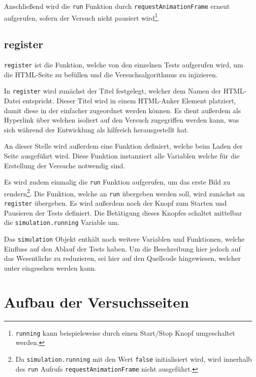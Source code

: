 Anschließend wird die \lstinline{run} Funktion durch \lstinline{requestAnimationFrame} erneut aufgerufen, sofern der Versuch nicht pausiert wird\footnote{\lstinline{running} kann beispielsweise durch einen Start/Stop Knopf umgeschaltet werden.}.

\subsection{register}\label{ch:sim_register}

\lstinline{register} ist die Funktion, welche von den einzelnen Tests aufgerufen wird, um die HTML-Seite zu befüllen und die Versuchsalgorithmus zu injizieren.

In \lstinline{register} wird zunächst der Titel festgelegt, welcher dem Namen der HTML-Datei entspricht.
Dieser Titel wird in einem HTML-Anker Element platziert, damit diese in der  einfacher zugeordnet werden können.
Es dient au{\ss}erdem als Hyperlink über welchen isoliert auf den Versuch zugegriffen werden kann, was sich während der Entwicklung als hilfreich herausgestellt hat.

An dieser Stelle wird au{\ss}erdem eine Funktion definiert, welche beim Laden der Seite ausgeführt wird.
Diese Funktion instanziert alle Variablen welche für die Erstellung der Versuche notwendig sind.

Es wird zudem einmalig die \lstinline{run} Funktion aufgerufen, um das erste Bild zu rendern\footnote{Da \lstinline{simulation.running} mit den Wert \lstinline{false} initialisiert wird, wird innerhalb des \lstinline{run} Aufrufs \lstinline{requestAnimationFrame} nicht ausgeführt.}.
Die Funktion, welche an \lstinline{run} übergeben werden soll, wird zunächst an \lstinline{register} übergeben.
Es wird au{\ss}erdem noch der Knopf zum Starten und Pausieren der Tests definiert.
Die Betätigung dieses Knopfes schaltet mittelbar die \lstinline{simulation.running} Variable um.

Das \lstinline{simulation} Objekt enthält noch weitere Variablen und Funktionen, welche Einfluss auf den Ablauf der Tests haben.
Um die Beschreibung hier jedoch auf das Wesentliche zu reduzieren, sei hier auf den Quellcode hingewiesen, welcher unter  eingesehen werden kann.

\section{Aufbau der Versuchsseiten}\label{ch:aufbau_der_testseiten}

